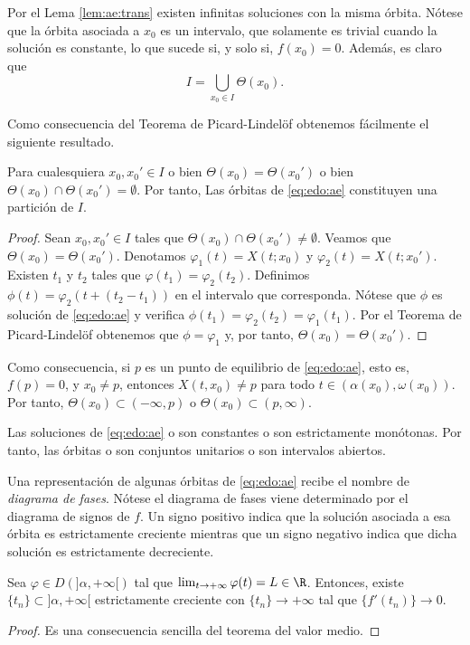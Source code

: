\documentclass{article}
\begin{document}
Por el Lema \ref{lem:ae:trans} existen infinitas soluciones con la misma órbita.
Nótese que la órbita asociada a $x_0$ es un intervalo, que solamente es trivial cuando la solución
es constante, lo que sucede si, y solo si, $f(x_0) = 0$. Además, es claro que
\[I = \bigcup_{x_0 \in I} \Theta(x_0).\]

Como consecuencia del Teorema de Picard-Lindelöf obtenemos fácilmente el siguiente resultado.

\begin{prop}
  Para cualesquiera $x_0, x_0' \in I$ o bien $\Theta(x_0) = \Theta(x_0')$ o bien
  $\Theta(x_0) \cap \Theta(x_0') = \emptyset$. Por tanto, Las órbitas de \eqref{eq:edo:ae}
  constituyen una partición de $I$.
\end{prop}
\begin{proof}
  Sean $x_0, x_0' \in I$ tales que $\Theta(x_0) \cap \Theta(x_0') \ne \emptyset$. Veamos que $\Theta(x_0) = \Theta(x_0')$. Denotamos
  $\varphi_1(t) = X(t; x_0)$ y $\varphi_2(t) = X(t; x_0')$. Existen $t_1$ y $t_2$ tales que
  $\varphi(t_1) = \varphi_2(t_2)$. Definimos $\phi(t) = \varphi_2(t + (t_2 - t_1))$ en el intervalo que corresponda. Nótese que $\phi$ es solución
  de \eqref{eq:edo:ae} y verifica $\phi(t_1) = \varphi_2(t_2) = \varphi_1(t_1)$. Por el Teorema de
  Picard-Lindelöf obtenemos que $\phi = \varphi_1$ y, por tanto, $\Theta(x_0) = \Theta(x_0')$.
\end{proof}

Como consecuencia, si $p$ es un punto de equilibrio de \eqref{eq:edo:ae}, esto es, $f(p) = 0$, y
$x_0 \ne p$, entonces $X(t, x_0) \ne p$ para todo $t \in (\alpha(x_0), \omega(x_0))$. Por tanto,
$\Theta(x_0) \subset (-\infty, p)$ o $\Theta(x_0) \subset (p, \infty)$.
  
\begin{cor}
  Las soluciones de \eqref{eq:edo:ae} o son constantes o son estrictamente monótonas. Por tanto, las
  órbitas o son conjuntos unitarios o son intervalos abiertos.
\end{cor}

Una representación de algunas órbitas de \eqref{eq:edo:ae} recibe el nombre de \emph{diagrama de
  fases}. Nótese el diagrama de fases viene determinado por el diagrama de signos de $f$. Un signo
positivo indica que la solución asociada a esa órbita es estrictamente creciente mientras que un
signo negativo indica que dicha solución es estrictamente decreciente.

\begin{lemma}
  \label{lem:barbalet}
  Sea $\varphi \in D(]\alpha, +\infty[)$ tal que $\lim_{t \to +\infty} \varphi(t) = L \in
  \R$. Entonces, existe $\{t_n\} \subset ]\alpha, +\infty[$ estrictamente creciente con
  $\{t_n\} \to +\infty$ tal que $\{f'(t_n)\} \to 0$.
\end{lemma}
\begin{proof}
  Es una consecuencia sencilla del teorema del valor medio.
\end{proof}
\end{document}

